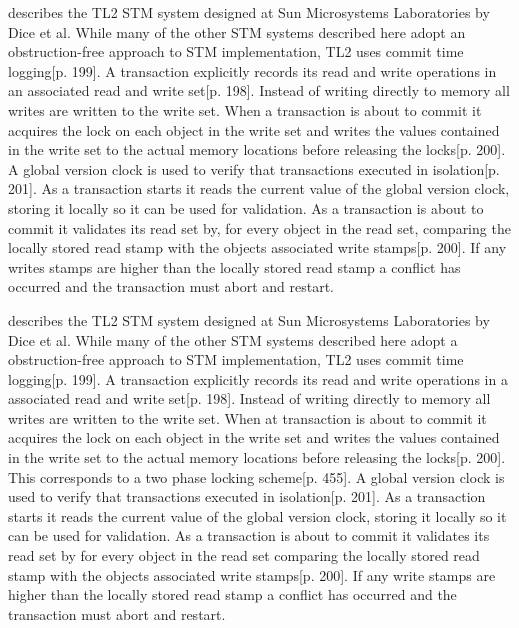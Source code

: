 \cite{dice2006transactional} describes the TL2 \ac{STM} system designed at Sun Microsystems Laboratories by Dice et al. While many of the other \ac{STM} systems described here adopt an obstruction-free approach to \ac{STM} implementation, TL2 uses commit time logging\cite{dice2006transactional}[p. 199]. A transaction explicitly records its read and write operations in an associated read and write set\cite{dice2006transactional}[p. 198]. Instead of writing directly to memory all writes are written to the write set. When a transaction is about to commit it acquires the lock on each object in the write set and writes the values contained in the write set to the actual memory locations before releasing the locks\cite{dice2006transactional}[p. 200].
A global version clock is used to verify that transactions executed in isolation\cite{dice2006transactional}[p. 201]. As a transaction starts it reads the current value of the global version clock, storing it locally so it can be used for validation. As a transaction is about to commit it validates its read set by, for every object in the read set, comparing the locally stored read stamp with the objects associated write stamps\cite{dice2006transactional}[p. 200]. If any writes stamps are higher than the locally stored read stamp a conflict has occurred and the transaction must abort and restart.

\cite{dice2006transactional} describes the TL2 \ac{STM} system designed at Sun Microsystems Laboratories by Dice et al. While many of the other \ac{STM} systems described here adopt a obstruction-free approach to \ac{STM} implementation, TL2 uses commit time logging\cite{dice2006transactional}[p. 199]. A transaction explicitly records its read and write operations in a associated read and write set\cite{dice2006transactional}[p. 198]. Instead of writing directly to memory all writes are written to the write set. When at transaction is about to commit it acquires the lock on each object in the write set and writes the values contained in the write set to the actual memory locations before releasing the locks\cite{dice2006transactional}[p. 200]. This corresponds to a two phase locking scheme\cite{tanenbaum2008modern}[p. 455]. A global version clock is used to verify that transactions executed in isolation\cite{dice2006transactional}[p. 201]. As a transaction starts it reads the current value of the global version clock, storing it locally so it can be used for validation. As a transaction is about to commit it validates its read set by for every object in the read set comparing the locally stored read stamp with the objects associated write stamps\cite{dice2006transactional}[p. 200]. If any write stamps are higher than the locally stored read stamp a conflict has occurred and the transaction must abort and restart. 

